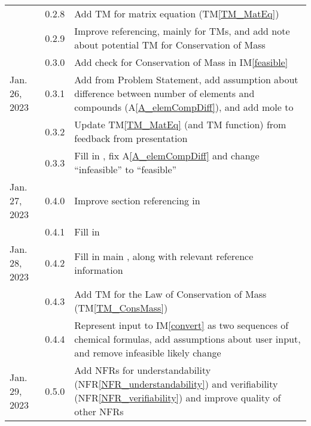 \documentclass[12pt]{article}
\newcommand{\tmref}[1]{TM\ref{#1}}
\newcommand{\aref}[1]{A\ref{#1}}
\newcommand{\iref}[1]{IM\ref{#1}}
\newcommand{\nfrref}[1]{NFR\ref{#1}}
\begin{document}
\begin{tabularx}{\textwidth}{p{2.5cm}p{1.5cm}X}
                      & 0.2.8         & Add TM for matrix equation (\tmref{TM_MatEq})                        \\
                      & 0.2.9         & Improve referencing, mainly for TMs, and add note about
  potential TM for Conservation of Mass                                                                      \\
                      & 0.3.0         & Add check for Conservation of Mass in \iref{feasible}                \\
  Jan. 26, 2023       & 0.3.1         & Add \nameref{sec_LCs} from Problem Statement, add
  assumption about difference between number of elements and compounds
  (\aref{A_elemCompDiff}), and add mole to \nameref{sec_ToU}                                                 \\
                      & 0.3.2         & Update \tmref{TM_MatEq} (and TM function) from feedback from
  presentation                                                                                               \\
                      & 0.3.3         & Fill in \nameref{sec_scope}, fix \aref{A_elemCompDiff} and
  change ``infeasible'' to ``feasible''                                                                      \\
  Jan. 27, 2023       & 0.4.0         & Improve section referencing in \nameref{sec_revHist}                 \\
                      & 0.4.1         & Fill in \nameref{sec_funcReqs}                                       \\
  Jan. 28, 2023       & 0.4.2         & Fill in main \nameref{sec_nonfuncReqs}, along with
  relevant reference information                                                                             \\
                      & 0.4.3         & Add TM for the Law of Conservation of Mass
  (\tmref{TM_ConsMass})                                                                                      \\
                      & 0.4.4         & Represent input to \iref{convert} as two sequences of chemical
  formulas, add assumptions about user input, and remove infeasible
  likely change                                                                                              \\
  Jan. 29, 2023       & 0.5.0         & Add NFRs for understandability
  (\nfrref{NFR_understandability}) and verifiability
  (\nfrref{NFR_verifiability}) and improve quality of other NFRs                                             \\

\end{tabularx}
\end{document}
